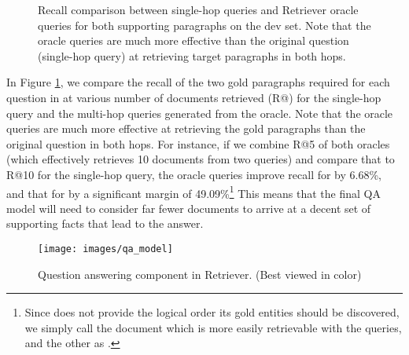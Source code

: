 \begin{figure}
     \caption{Recall comparison between single-hop queries and \golden{} Retriever oracle queries for both supporting paragraphs on the \hotpotqa{} dev set.
    Note that the oracle queries are much more effective than the original question (single-hop query) at retrieving target paragraphs in both hops.}
    \label{fig:question_vs_oracle}
\end{figure}

In Figure \ref{fig:question_vs_oracle}, we compare the recall of the two gold paragraphs required for each question in \hotpotqa{} at various number of documents retrieved (R@) for the single-hop query and the multi-hop queries generated from the oracle.
Note that the oracle queries are much more effective at retrieving the gold paragraphs than the original question in both hops.
For instance, if we combine R@5 of both oracles (which effectively retrieves 10 documents from two queries) and compare that to R@10 for the single-hop query, the oracle queries improve recall for  by 6.68\%, and that for  by a significant margin of 49.09\%\footnote{Since \hotpotqa{} does not provide the logical order its gold entities should be discovered, we simply call the document  which is more easily retrievable with the queries, and the other as .}
This means that the final QA model will need to consider far fewer documents to arrive at a decent set of supporting facts that lead to the answer.

\begin{figure}
    \centering
    \texttt{[image: images/qa\_model]}
    \caption{Question answering component in \golden{} Retriever. (Best viewed in color)} \label{fig:qa_model}
\end{figure}

